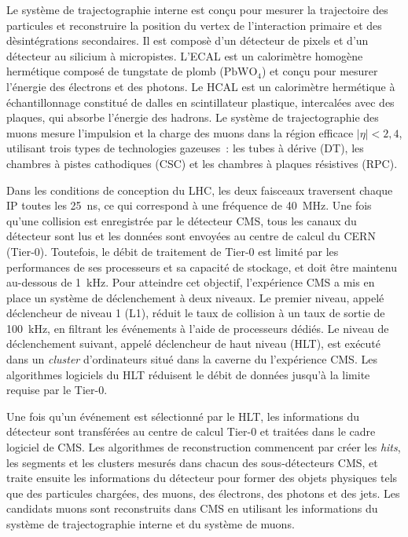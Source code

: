 Le syst{\`e}me de trajectographie interne est con{\c{c}}u pour mesurer la trajectoire des particules et reconstruire la position du vertex de l'interaction primaire et des d{\`e}sint{\'e}grations secondaires. Il est compos{\`e} d'un d{\'e}tecteur de pixels et d'un d{\'e}tecteur au silicium {\`a} micropistes. L'ECAL est un calorim{\`e}tre homog{\`e}ne herm{\'e}tique compos{\'e} de tungstate de plomb ($\text{PbWO}_{4}$) et con{\c{c}}u pour mesurer l'{\'e}nergie des {\'e}lectrons et des photons. Le HCAL est un calorim{\`e}tre herm{\'e}tique {\`a} {\'e}chantillonnage constitu{\'e} de dalles en scintillateur plastique, intercal{\'e}es avec des plaques, qui absorbe l'{\'e}nergie des hadrons. Le syst{\`e}me de trajectographie des muons mesure l'impulsion et la charge des muons dans la r{\'e}gion efficace $|\eta|<2,4$, utilisant trois types de technologies gazeuses{~:} les tubes {\`a} d{\'e}rive (DT), les chambres {\`a} pistes cathodiques (CSC) et les chambres {\`a} plaques r{\'e}sistives (RPC).

Dans les conditions de conception du LHC, les deux faisceaux traversent chaque IP toutes les \SI{25}{\ns}, ce qui correspond {\`a} une fr{\'e}quence de \SI{40}{\MHz}. Une fois qu'une collision est enregistr{\'e}e par le d{\'e}tecteur CMS, tous les canaux du d{\'e}tecteur sont lus et les donn{\'e}es sont envoy{\'e}es au centre de calcul du CERN (Tier-0). Toutefois, le d{\'e}bit de traitement de Tier-0 est limit{\'e} par les performances de ses processeurs et sa capacit{\'e} de stockage, et doit {\^e}tre maintenu au-dessous de \SI{1}{\kHz}. Pour atteindre cet objectif, l'exp{\'e}rience CMS a mis en place un syst{\`e}me de d{\'e}clenchement {\`a} deux niveaux. Le premier niveau, appel{\'e} d{\'e}clencheur de niveau 1 (L1), r{\'e}duit le taux de collision {\`a} un taux de sortie de \SI{100}{\kHz}, en filtrant les {\'e}v{\'e}nements {\`a} l'aide de processeurs d{\'e}di{\'e}s. Le niveau de d{\'e}clenchement suivant, appel{\'e} d{\'e}clencheur de haut niveau (HLT), est ex{\'e}cut{\'e} dans un \textit{cluster} d'ordinateurs situ{\'e} dans la caverne du l'exp{\'e}rience CMS. Les algorithmes logiciels du HLT r{\'e}duisent le d{\'e}bit de donn{\'e}es jusqu'{\`a} la limite requise par le Tier-0.

Une fois qu'un {\'e}v{\'e}nement est s{\'e}lectionn{\'e} par le HLT, les informations du d{\'e}tecteur sont transf{\'e}r{\'e}es au centre de calcul Tier-0 et trait{\'e}es dans le cadre logiciel de CMS. Les algorithmes de reconstruction commencent par cr{\'e}er les \textit{hits}, les segments et les clusters mesur{\'e}s dans chacun des sous-d{\'e}tecteurs CMS, et traite ensuite les informations du d{\'e}tecteur pour former des objets physiques tels que des particules charg{\'e}es, des muons, des {\'e}lectrons, des photons et des jets. Les candidats muons sont reconstruits dans CMS en utilisant les informations du syst{\`e}me de trajectographie interne et du syst{\`e}me de muons.

